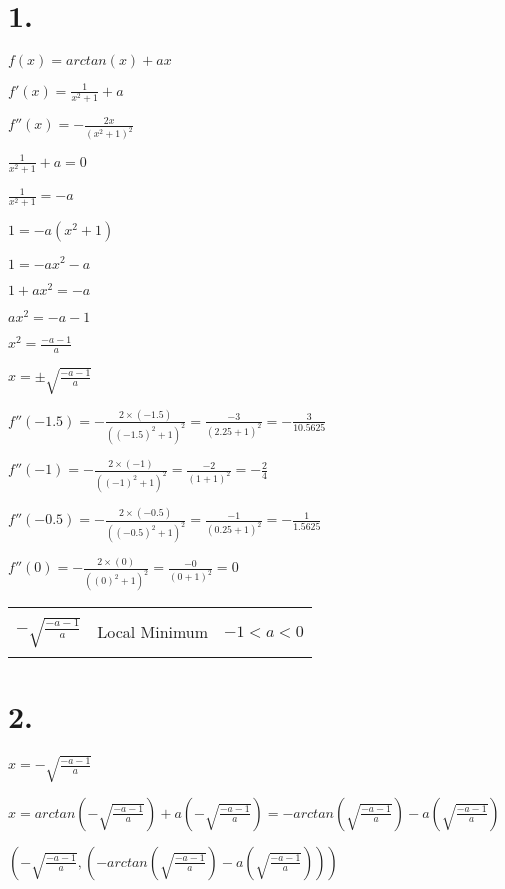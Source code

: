 \section*{1.}

$f(x) = arctan(x) + ax$

$f'(x) = \frac{1}{x^2 + 1} + a$

$f''(x) = -\frac{2x}{(x^2 + 1)^2}$ \newline

$\frac{1}{x^2 + 1} + a = 0$

$\frac{1}{x^2 + 1} = -a$

$1 = -a(x^2 + 1)$

$1 = -ax^2 - a$

$1 + ax^2 = -a$

$ax^2 = -a - 1$

$x^2 = \frac{-a - 1}{a}$

$x = \pm \sqrt{\frac{-a - 1}{a}}$

$f''(-1.5) = -\frac{2 \times (-1.5)}{((-1.5)^2 + 1)^2} = \frac{-3}{(2.25 + 1)^2} = -\frac{3}{10.5625}$

$f''(-1) = -\frac{2 \times (-1)}{((-1)^2 + 1)^2} = \frac{-2}{(1 + 1)^2} = -\frac{2}{4}$

$f''(-0.5) = -\frac{2 \times (-0.5)}{((-0.5)^2 + 1)^2} = \frac{-1}{(0.25 + 1)^2} = -\frac{1}{1.5625}$

$f''(0) = -\frac{2 \times (0)}{((0)^2 + 1)^2} = \frac{-0}{(0 + 1)^2} = 0$

\begin{tabular}{| l | l | l |}
    \hline
    & & \\
    $- \sqrt{\frac{-a - 1}{a}}$ & Local Minimum & $-1 < a < 0$ \\
    & & \\
    \hline
\end{tabular}

\section*{2.}

$x = -\sqrt{\frac{-a - 1}{a}}$

$x = arctan(-\sqrt{\frac{-a - 1}{a}}) + a(-\sqrt{\frac{-a - 1}{a}}) = -arctan(\sqrt{\frac{-a - 1}{a}}) - a(\sqrt{\frac{-a - 1}{a}})$

$\boxed{(-\sqrt{\frac{-a - 1}{a}}, (-arctan(\sqrt{\frac{-a - 1}{a}}) - a(\sqrt{\frac{-a - 1}{a}})))}$
